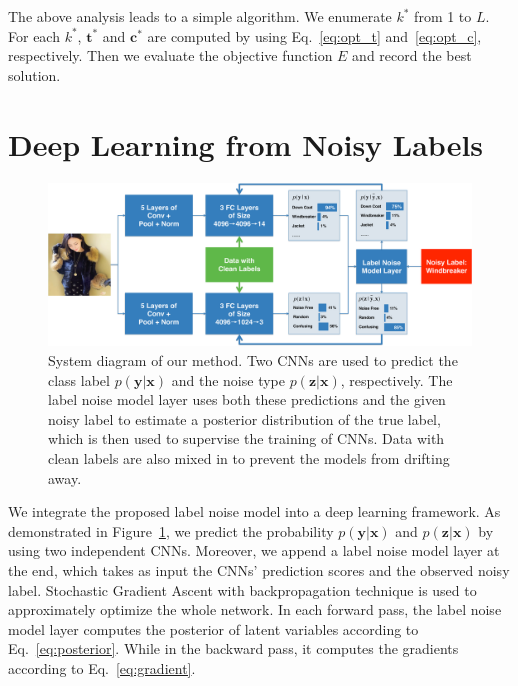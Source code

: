 \documentclass[10pt,twocolumn,letterpaper]{article}
\def\vec{\mathbf}
\begin{document}
The above analysis leads to a simple algorithm. We enumerate $k^*$ from 1 to $L$. For each $k^*$, $\vec{t}^*$ and $\vec{c}^*$ are computed by using Eq.~\eqref{eq:opt_t} and~\eqref{eq:opt_c}, respectively. Then we evaluate the objective function $E$ and record the best solution.




\section{Deep Learning from Noisy Labels} %
\label{sec:deep_learning_from_noisy_labels}

\begin{figure}
\begin{center}
\includegraphics[width=1.0\linewidth]{figure/diagram.pdf}
\end{center}
\caption{System diagram of our method. Two CNNs are used to predict the class label $p(\vec{y}|\vec{x})$ and the noise type $p(\vec{z}|\vec{x})$, respectively. The label noise model layer uses both these predictions and the given noisy label to estimate a posterior distribution of the true label, which is then used to supervise the training of CNNs. Data with clean labels are also mixed in to prevent the models from drifting away.}
\label{fig:framework}
\end{figure}

We integrate the proposed label noise model into a deep learning framework. As demonstrated in Figure~\ref{fig:framework}, we predict the probability $p(\vec{y}|\vec{x})$ and $p(\vec{z}|\vec{x})$ by using two independent CNNs. Moreover, we append a label noise model layer at the end, which takes as input the CNNs' prediction scores and the observed noisy label. Stochastic Gradient Ascent with backpropagation technique is used to approximately optimize the whole network. In each forward pass, the label noise model layer computes the posterior of latent variables according to Eq.~\eqref{eq:posterior}. While in the backward pass, it computes the gradients according to Eq.~\eqref{eq:gradient}.
\end{document}
